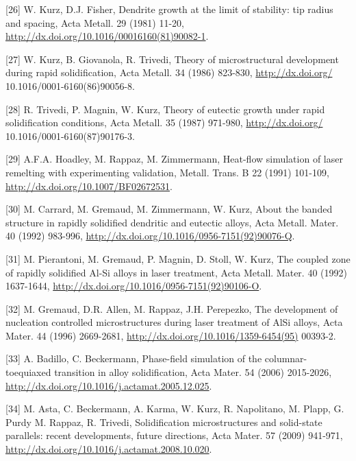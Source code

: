 \documentclass[10pt]{article}
\begin{document}
[26] W. Kurz, D.J. Fisher, Dendrite growth at the limit of stability: tip radius and spacing, Acta Metall. 29 (1981) 11-20, \href{http://dx.doi.org/10.1016/00016160(81)90082-1}{http://dx.doi.org/10.1016/00016160(81)90082-1}.

[27] W. Kurz, B. Giovanola, R. Trivedi, Theory of microstructural development during rapid solidification, Acta Metall. 34 (1986) 823-830, \href{http://dx.doi.org/}{http://dx.doi.org/} 10.1016/0001-6160(86)90056-8.

[28] R. Trivedi, P. Magnin, W. Kurz, Theory of eutectic growth under rapid solidification conditions, Acta Metall. 35 (1987) 971-980, \href{http://dx.doi.org/}{http://dx.doi.org/} 10.1016/0001-6160(87)90176-3.

[29] A.F.A. Hoadley, M. Rappaz, M. Zimmermann, Heat-flow simulation of laser remelting with experimenting validation, Metall. Trans. B 22 (1991) 101-109, \href{http://dx.doi.org/10.1007/BF02672531}{http://dx.doi.org/10.1007/BF02672531}.

[30] M. Carrard, M. Gremaud, M. Zimmermann, W. Kurz, About the banded structure in rapidly solidified dendritic and eutectic alloys, Acta Metall. Mater. 40 (1992) 983-996, \href{http://dx.doi.org/10.1016/0956-7151(92)90076-Q}{http://dx.doi.org/10.1016/0956-7151(92)90076-Q}.

[31] M. Pierantoni, M. Gremaud, P. Magnin, D. Stoll, W. Kurz, The coupled zone of rapidly solidified Al-Si alloys in laser treatment, Acta Metall. Mater. 40 (1992) 1637-1644, \href{http://dx.doi.org/10.1016/0956-7151(92)90106-O}{http://dx.doi.org/10.1016/0956-7151(92)90106-O}.

[32] M. Gremaud, D.R. Allen, M. Rappaz, J.H. Perepezko, The development of nucleation controlled microstructures during laser treatment of AlSi alloys, Acta Mater. 44 (1996) 2669-2681, \href{http://dx.doi.org/10.1016/1359-6454(95)}{http://dx.doi.org/10.1016/1359-6454(95)} 00393-2.

[33] A. Badillo, C. Beckermann, Phase-field simulation of the columnar-toequiaxed transition in alloy solidification, Acta Mater. 54 (2006) 2015-2026, \href{http://dx.doi.org/10.1016/j.actamat.2005.12.025}{http://dx.doi.org/10.1016/j.actamat.2005.12.025}.

[34] M. Asta, C. Beckermann, A. Karma, W. Kurz, R. Napolitano, M. Plapp, G. Purdy M. Rappaz, R. Trivedi, Solidification microstructures and solid-state parallels: recent developments, future directions, Acta Mater. 57 (2009) 941-971, \href{http://dx.doi.org/10.1016/j.actamat.2008.10.020}{http://dx.doi.org/10.1016/j.actamat.2008.10.020}.
\end{document}
